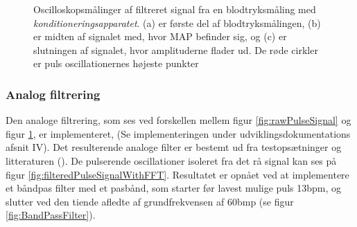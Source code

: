 \begin{figure}[H]
	\centering
	\caption{Oscilloskopsmålinger af filtreret signal fra en blodtryksmåling med \textit{konditioneringsapparatet}. (a) er første del af blodtryksmålingen, (b) er midten af signalet med, hvor MAP befinder sig, og (c) er slutningen af signalet, hvor amplituderne flader ud. De røde cirkler er puls oscillationernes højeste punkter}\label{fig:filteredPulseSignal}
\end{figure}

\subsubsection{Analog filtrering}
Den analoge filtrering, som ses ved forskellen mellem figur \ref{fig:rawPulseSignal} og figur \ref{fig:filteredPulseSignal}, er implementeret, (Se implementeringen under udviklingsdokumentations afsnit IV). 
Det resulterende analoge filter er bestemt ud fra testopsætninger og litteraturen (\cite{RefWorks:8}). De pulserende oscillationer isoleret fra det rå signal kan ses på figur \ref{fig:filteredPulseSignalWithFFT}. Resultatet er opnået ved at implementere et båndpas filter med et pasbånd, som starter før lavest mulige puls 13bpm, og slutter ved den tiende afledte af grundfrekvensen af 60bmp (se figur \ref*{fig:BandPassFilter}).

